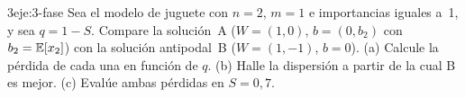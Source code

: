 \begin{ejercicio}{3}{eje:3-fase}
Sea el modelo de juguete con $n=2$, $m=1$ e importancias iguales a~1, y sea $q=1-S$. Compare la solución~A ($W=(1,0)$, $b=(0,b_2)$ con $b_2=\mathbb{E}[x_2]$) con la solución antipodal~B ($W=(1,-1)$, $b=0$). (a) Calcule la pérdida de cada una en función de $q$. (b) Halle la dispersión a partir de la cual B es mejor. (c) Evalúe ambas pérdidas en $S=0{,}7$.
\end{ejercicio}

